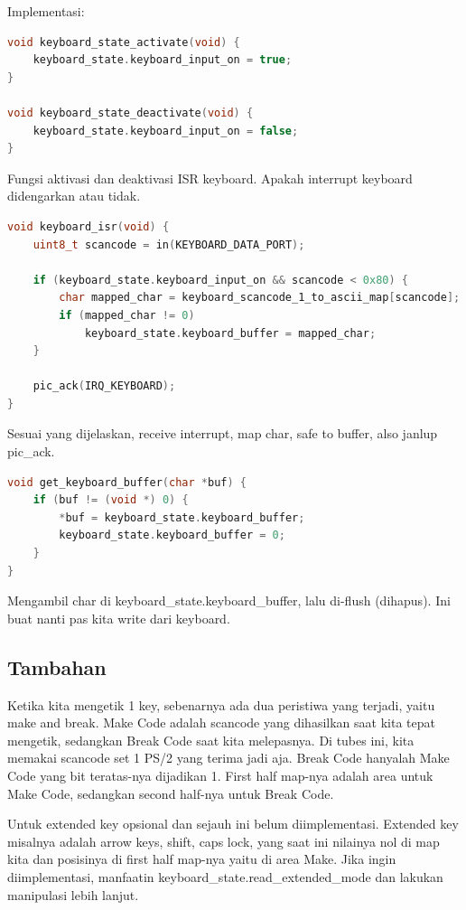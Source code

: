 Implementasi:

\begin{lstlisting}[language=c]
void keyboard_state_activate(void) {
    keyboard_state.keyboard_input_on = true;
}

void keyboard_state_deactivate(void) {
    keyboard_state.keyboard_input_on = false;
}
\end{lstlisting}

Fungsi aktivasi dan deaktivasi ISR keyboard. Apakah interrupt keyboard didengarkan atau tidak.

\begin{lstlisting}[language=c]
void keyboard_isr(void) {
    uint8_t scancode = in(KEYBOARD_DATA_PORT);

    if (keyboard_state.keyboard_input_on && scancode < 0x80) {
        char mapped_char = keyboard_scancode_1_to_ascii_map[scancode];
        if (mapped_char != 0)
            keyboard_state.keyboard_buffer = mapped_char;
    }

    pic_ack(IRQ_KEYBOARD);
}
\end{lstlisting}

Sesuai yang dijelaskan, receive interrupt, map char, safe to buffer, also janlup pic\_ack.

\begin{lstlisting}[language=c]
void get_keyboard_buffer(char *buf) {
    if (buf != (void *) 0) {
        *buf = keyboard_state.keyboard_buffer;
        keyboard_state.keyboard_buffer = 0;
    }
} 
\end{lstlisting}

Mengambil char di keyboard\_state.keyboard\_buffer, lalu di-flush (dihapus). Ini buat nanti pas kita write dari keyboard.

\subsection{Tambahan}

Ketika kita mengetik 1 key, sebenarnya ada dua peristiwa yang terjadi, yaitu make and break. Make Code adalah scancode yang dihasilkan saat kita tepat mengetik, sedangkan Break Code saat kita melepasnya. Di tubes ini, kita memakai scancode set 1 PS/2 yang terima jadi aja. Break Code hanyalah Make Code yang bit teratas-nya dijadikan 1. First half map-nya adalah area untuk Make Code, sedangkan second half-nya untuk Break Code.

Untuk extended key opsional dan sejauh ini belum diimplementasi. Extended key misalnya adalah arrow keys, shift, caps lock, yang saat ini nilainya nol di map kita dan posisinya di first half map-nya yaitu di area Make. Jika ingin diimplementasi, manfaatin keyboard\_state.read\_extended\_mode dan lakukan manipulasi lebih lanjut.

